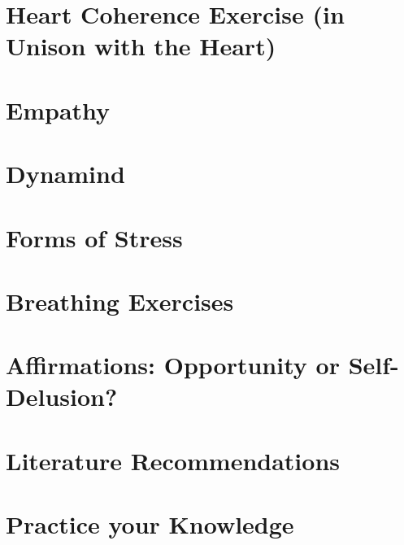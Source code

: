 \documentclass[../main.tex]{subfiles}
\begin{document}
\chapter[Heart Coherence Exercise]{Heart Coherence Exercise (in Unison with the Heart)}


\chapter{Empathy}


\chapter{Dynamind}


\chapter{Forms of Stress}


\chapter{Breathing Exercises}


\chapter[Affirmations]{Affirmations: Opportunity or Self-Delusion?}


\chapter{Literature Recommendations}



\chapter{Practice your Knowledge}

\end{document}
